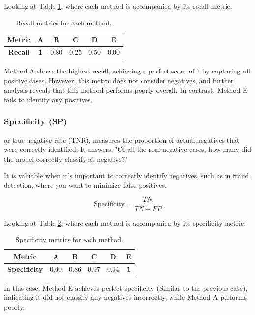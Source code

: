\documentclass{llncs}
\begin{document}
Looking at Table \ref{tab:recall}, where each method is accompanied by its recall metric:
\begin{table}[h]
	\centering
	\begin{tabular}{|c|c|c|c|c|c|} 
		\hline 
		\textbf{Metric} & \textbf{A} & \textbf{B} & \textbf{C} & \textbf{D} & \textbf{E} \\ 
		\hline 
		\textbf{Recall} & \textbf{1} & 0.80 & 0.25 & 0.50 & 0.00 \\ 
		\hline 
	\end{tabular} 
	\caption{Recall metrics for each method.} 
	\label{tab:recall} 
\end{table}

\vspace{-20pt}

Method A shows the highest recall, achieving a perfect score of 1 by capturing all positive cases. However, this metric does not consider negatives, and further analysis reveals that this method performs poorly overall. In contrast, Method E fails to identify any positives.

\subsubsection{Specificity (SP)} or true negative rate (TNR), measures the proportion of actual negatives that were correctly identified. It answers: "Of all the real negative cases, how many did the model correctly classify as negative?"

It is valuable when it's important to correctly identify negatives, such as in fraud detection, where you want to minimize false positives.

\[
\text{Specificity} = \frac{TN}{TN + FP}
\]

Looking at Table \ref{tab:specificity}, where each method is accompanied by its specificity metric:
\begin{table}[h]
	\centering
	\begin{tabular}{|c|c|c|c|c|c|} 
		\hline 
		\textbf{Metric} & \textbf{A} & \textbf{B} & \textbf{C} & \textbf{D} & \textbf{E} \\ 
		\hline 
		\textbf{Specificity} & 0.00 & 0.86 & 0.97 & 0.94 &  \textbf{1} \\ 
		\hline 
	\end{tabular} 
	\caption{Specificity metrics for each method.} 
	\label{tab:specificity} 
\end{table}


In this case, Method E achieves perfect specificity (Similar to the previous case), indicating it did not classify any negatives incorrectly, while Method A performs poorly.
\end{document}
